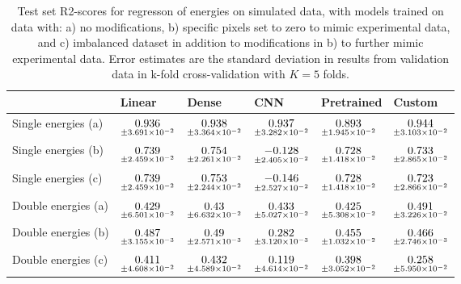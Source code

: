 \begin{table}
\centering
\caption{
Test set R2-scores for regresson of energies on simulated data, with models trained on data with: 
a) no modifications, b) specific pixels set to zero to mimic experimental data, and c) imbalanced dataset
in addition to modifications in b) to further mimic experimental data. Error estimates are the standard deviation 
in results from validation data in k-fold cross-validation with $K=5$ folds.
}
\label{tab:regression-simulated-all-energies-r2}
\begin{tabular}{llllll}
\toprule
{} &                                              Linear &                                               Dense &                                                  CNN &                                          Pretrained &                                              Custom \\
\midrule
Single energies (a) &  $\underset{\num{+- 3.691e-02 }  }{\num{ 0.936 } }$ &  $\underset{\num{+- 3.364e-02 }  }{\num{ 0.938 } }$ &  $\underset{\num{+- 3.282e-02 }  }{\num{ 0.937 } }$ &  $\underset{\num{+- 1.945e-02 }  }{\num{ 0.893 } }$ &  $\underset{\num{+- 3.103e-02 }  }{\num{ 0.944 } }$ \\
Single energies (b) &  $\underset{\num{+- 2.459e-02 }  }{\num{ 0.739 } }$ &  $\underset{\num{+- 2.261e-02 }  }{\num{ 0.754 } }$ &  $\underset{\num{+- 2.405e-02 }  }{\num{ -0.128 } }$ &  $\underset{\num{+- 1.418e-02 }  }{\num{ 0.728 } }$ &  $\underset{\num{+- 2.865e-02 }  }{\num{ 0.733 } }$ \\
Single energies (c) &  $\underset{\num{+- 2.459e-02 }  }{\num{ 0.739 } }$ &  $\underset{\num{+- 2.244e-02 }  }{\num{ 0.753 } }$ &  $\underset{\num{+- 2.527e-02 }  }{\num{ -0.146 } }$ &  $\underset{\num{+- 1.418e-02 }  }{\num{ 0.728 } }$ &  $\underset{\num{+- 2.866e-02 }  }{\num{ 0.723 } }$ \\
Double energies (a) &  $\underset{\num{+- 6.501e-02 }  }{\num{ 0.429 } }$ &  $\underset{\num{+- 6.632e-02 }  }{\num{ 0.43 } }$ &  $\underset{\num{+- 5.027e-02 }  }{\num{ 0.433 } }$ &  $\underset{\num{+- 5.308e-02 }  }{\num{ 0.425 } }$ &  $\underset{\num{+- 3.226e-02 }  }{\num{ 0.491 } }$ \\
Double energies (b) &  $\underset{\num{+- 3.155e-03 }  }{\num{ 0.487 } }$ &  $\underset{\num{+- 2.571e-03 }  }{\num{ 0.49 } }$ &  $\underset{\num{+- 3.120e-03 }  }{\num{ 0.282 } }$ &  $\underset{\num{+- 1.032e-02 }  }{\num{ 0.455 } }$ &  $\underset{\num{+- 2.746e-03 }  }{\num{ 0.466 } }$ \\
Double energies (c) &  $\underset{\num{+- 4.608e-02 }  }{\num{ 0.411 } }$ &  $\underset{\num{+- 4.589e-02 }  }{\num{ 0.432 } }$ &  $\underset{\num{+- 4.614e-02 }  }{\num{ 0.119 } }$ &  $\underset{\num{+- 3.052e-02 }  }{\num{ 0.398 } }$ &  $\underset{\num{+- 5.950e-02 }  }{\num{ 0.258 } }$ \\
\bottomrule
\end{tabular}
\end{table}

